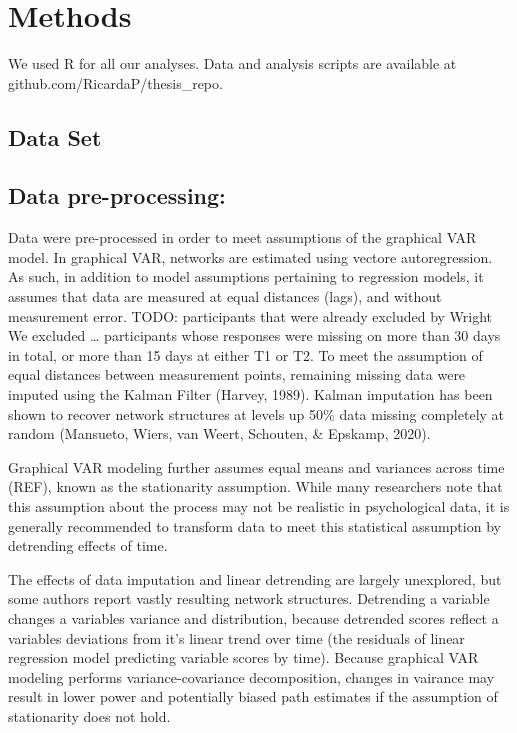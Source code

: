 \documentclass[
  english,
  man]{apa6}
\begin{document}
\hypertarget{methods}{%
\section{Methods}\label{methods}}

We used R for all our analyses.
Data and analysis scripts are available at github.com/RicardaP/thesis\_repo.

\hypertarget{data-set}{%
\subsection{Data Set}\label{data-set}}

\hypertarget{data-pre-processing}{%
\subsection{Data pre-processing:}\label{data-pre-processing}}

Data were pre-processed in order to meet assumptions of the graphical VAR model.
In graphical VAR, networks are estimated using vectore autoregression.
As such, in addition to model assumptions pertaining to regression models, it assumes that data are measured at equal distances (lags), and without measurement error.
TODO: participants that were already excluded by Wright We excluded \ldots{} participants whose responses were missing on more than 30 days in total, or more than 15 days at either T1 or T2.
To meet the assumption of equal distances between measurement points, remaining missing data were imputed using the Kalman Filter (Harvey, 1989).
Kalman imputation has been shown to recover network structures at levels up 50\% data missing completely at random (Mansueto, Wiers, van Weert, Schouten, \& Epskamp, 2020).

Graphical VAR modeling further assumes equal means and variances across time (REF), known as the stationarity assumption.
While many researchers note that this assumption about the process may not be realistic in psychological data, it is generally recommended to transform data to meet this statistical assumption by detrending effects of time.

The effects of data imputation and linear detrending are largely unexplored, but some authors report vastly resulting network structures.
Detrending a variable changes a variables variance and distribution, because detrended scores reflect a variables deviations from it's linear trend over time (the residuals of linear regression model predicting variable scores by time).
Because graphical VAR modeling performs variance-covariance decomposition, changes in vairance may result in lower power and potentially biased path estimates if the assumption of stationarity does not hold.
\end{document}
